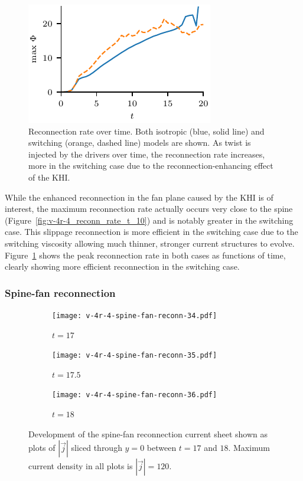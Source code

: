 \begin{figure}[t]
  \centering
  \includegraphics[width=0.5\linewidth]{v-4r-4_reconn_rate_over_time}
  \caption{Reconnection rate over time. Both isotropic (blue, solid line) and switching (orange, dashed line) models are shown. As twist is injected by the drivers over time, the reconnection rate increases, more in the switching case due to the reconnection-enhancing effect of the KHI.}%
  \label{fig:v-4r-4_reconn_rate_over_time}
\end{figure}

While the enhanced reconnection in the fan plane caused by the KHI is of interest, the maximum reconnection rate actually occurs very close to the spine (Figure~\ref{fig:v-4r-4_reconn_rate_t_10}) and is notably greater in the switching case. This slippage reconnection is more efficient in the switching case due to the switching viscosity allowing much thinner, stronger current structures to evolve. Figure~\ref{fig:v-4r-4_reconn_rate_over_time} shows the peak reconnection rate in both cases as functions of time, clearly showing more efficient reconnection in the switching case.

\subsubsection{Spine-fan reconnection}

\begin{figure}[t]
  \centering
    \begin{subfigure}{0.32\textwidth}
      \texttt{[image: v-4r-4-spine-fan-reconn-34.pdf]}
      \caption{$t=17$}
      \label{fig:v-4r-4-spine-fan-reconn-34}
    \end{subfigure}
    \hfill
    \begin{subfigure}{0.32\textwidth}
      \texttt{[image: v-4r-4-spine-fan-reconn-35.pdf]}
      \caption{$t=17.5$}
      \label{fig:v-4r-4-spine-fan-reconn-35}
    \end{subfigure}
    \hfill
    \begin{subfigure}{0.32\textwidth}
      \texttt{[image: v-4r-4-spine-fan-reconn-36.pdf]}
      \caption{$t=18$}
      \label{fig:v-4r-4-spine-fan-reconn-36}
    \end{subfigure}
\caption{Development of the spine-fan reconnection current sheet shown as plots of $|\vec{j}|$ sliced through $y=0$ between $t=17$ and $18$. Maximum current density in all plots is $|\vec{j}| = 120$.}
\label{fig:spine_fan_reconnection_current_sheet}
\end{figure}

